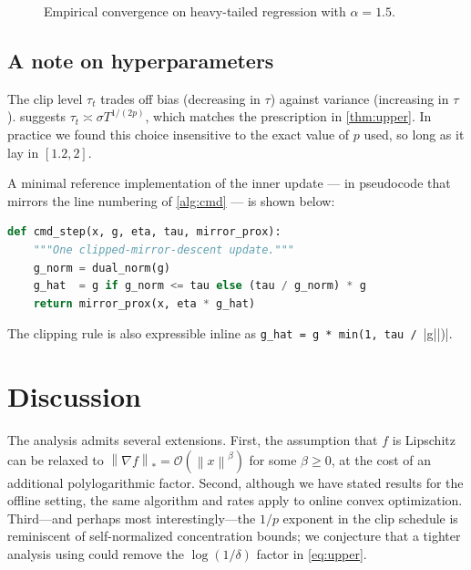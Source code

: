 \documentclass[11pt,a4paper]{article}
\theoremstyle{plain}
\theoremstyle{definition}
\theoremstyle{remark}
\newcommand{\norm}[1]{\left\lVert#1\right\rVert}
\begin{document}
\begin{figure}[t]
\centering
{}
\caption{Empirical convergence on heavy-tailed regression with $\alpha = 1.5$.}
\label{fig:convergence}
\end{figure}

\subsection{A note on hyperparameters}

The clip level $\tau_t$ trades off bias (decreasing in $\tau$) against
variance (increasing in $\tau$).  suggests
$\tau_t \asymp \sigma T^{1/(2p)}$, which matches the prescription in
\cref{thm:upper}. In practice we found this choice insensitive to the exact
value of $p$ used, so long as it lay in $[1.2, 2]$.

A minimal reference implementation of the inner update --- in pseudocode that
mirrors the line numbering of \cref{alg:cmd} --- is shown below:

\begin{lstlisting}[language=Python]
def cmd_step(x, g, eta, tau, mirror_prox):
    """One clipped-mirror-descent update."""
    g_norm = dual_norm(g)
    g_hat  = g if g_norm <= tau else (tau / g_norm) * g
    return mirror_prox(x, eta * g_hat)
\end{lstlisting}

\noindent The clipping rule is also expressible inline as
\verb|g_hat = g * min(1, tau / ||g||)|.

\section{Discussion}
\label{sec:disc}

The analysis admits several extensions. First, the assumption that $f$ is
Lipschitz can be relaxed to
$\norm{\nabla f}_* = \mathcal{O}(\norm{x}^\beta)$ for some $\beta \geq 0$, at
the cost of an additional polylogarithmic factor. Second, although we have
stated results for the offline setting, the same algorithm and rates apply to
online convex optimization. Third---and perhaps most interestingly---the
$1/p$ exponent in the clip schedule is reminiscent of self-normalized
concentration bounds; we conjecture that a tighter analysis using
\citet{howard2021time} could remove the $\log(1/\delta)$ factor in
\eqref{eq:upper}.
\end{document}
